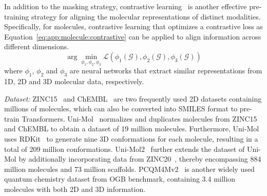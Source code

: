 In addition to the masking strategy, contrastive learning~\cite{hadsell2006dimensionality} is another effective pre-training strategy for aligning the molecular representations of distinct modalities. Specifically, for molecules, contrastive learning that optimizes a contrastive loss as Equation~\eqref{eq:app:molecule:contrastive} can be applied to align information across different dimensions. 
\begin{equation}
    \label{eq:app:molecule:contrastive}
     \arg \min_{\phi_1, \phi_2, \phi_3} \mathcal{L}(\phi_1(\mathcal{G}), \phi_2(\mathcal{G}), \phi_3(\mathcal{G}))
\end{equation}
where $\phi_1$, $\phi_2$ and $\phi_3$ are neural  networks that extract similar representations from 1D, 2D and 3D molecular data, respectively.

\textit{Dataset:}
ZINC15~\cite{sterling2015zinc} and ChEMBL~\cite{gaulton2012chembl} are two frequently used 2D datasets containing millions of molecules, which can also be converted into SMILES format to pre-train Transformers. Uni-Mol~\cite{zhou2023unimol} normalizes and duplicates molecules from ZINC15 and ChEMBL to obtain a dataset of 19 million molecules. Furthermore, Uni-Mol uses RDKit~\cite{landrum2013rdkit} to generate nine 3D conformations for each molecule, resulting in a total of 209 million conformations. Uni-Mol2~\cite{ji2024exploring} further extends the dataset of Uni-Mol by additionally incorporating data from ZINC20~\cite{irwin2020zinc20}, thereby  encompassing 884 million molecules and 73 million scaffolds.
PCQM4Mv2~\cite{hu2021ogblsc} is another widely used quantum chemistry dataset from OGB benchmark, containing 3.4 million molecules with both 2D and 3D information. 


